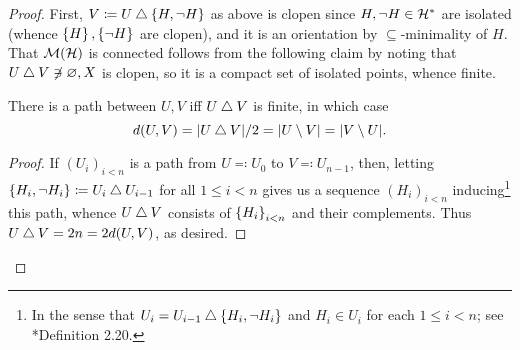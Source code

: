 \documentclass[reqno]{amsart}
\begin{document}
    \begin{proof}
        First, $V\coloneqq U\bigtriangleup\left\{H,\lnot H\right\}$ as above is clopen since $H,\lnot H\in\mathcal{H}^\ast$ are isolated (whence $\left\{H\right\},\left\{\lnot H\right\}$ are clopen), and it is an orientation by $\subseteq$-minimality of $H$. That $\mathcal{M}(\mathcal{H})$ is connected follows from the following claim by noting that $U\bigtriangleup V\not\ni\varnothing,X$ is clopen, so it is a compact set of isolated points, whence finite.
        \begin{center}
            \begin{minipage}{0.95\textwidth}
                \begin{claim*}
                    There is a path between $U,V$ iff $U\bigtriangleup V$ is finite, in which case
                    \begin{equation*}
                        d(U,V)=|U\bigtriangleup V|/2=|U\setminus V|=|V\setminus U|.
                    \end{equation*}
                \end{claim*}
                \begin{proof}
                    If $(U_i)_{i<n}$ is a path from $U\eqqcolon U_0$ to $V\eqqcolon U_{n-1}$, then, letting $\left\{H_i,\lnot H_i\right\}\coloneqq U_i\bigtriangleup U_{i-1}$ for all $1\leq i<n$ gives us a sequence $(H_i)_{i<n}$ inducing\footnote{In the sense that $U_i=U_{i-1}\bigtriangleup\left\{H_i,\lnot H_i\right\}$ and $H_i\in U_i$ for each $1\leq i<n$; see \cite{Tse20}*{Definition 2.20}.} this path, whence $U\bigtriangleup V$ consists of $\left\{H_i\right\}_{i<n}$ and their complements. Thus $U\bigtriangleup V=2n=2d(U,V)$, as desired.


\end{proof}
\end{minipage}
\end{center}
\end{proof}
\end{document}
